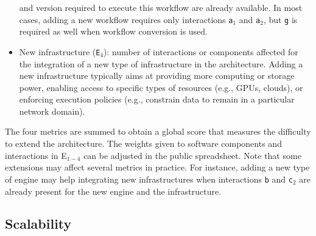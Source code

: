 \documentclass[preprint,3p,twocolumn]{elsarticle}
\newcommand{\correction}[1]{\color{blue}#1\color{black}\xspace}
\begin{document}
\begin{itemize}[leftmargin=0cm,itemindent=0.35cm,itemsep=0cm]
  and version required to execute this workflow are already
  available. In most cases, adding a new workflow requires only
  interactions \texttt{a$_1$} and \texttt{a$_2$}, but \texttt{g}
  is required as well when workflow conversion is used. 
\item New infrastructure (\texttt{E$_4$}): number of interactions or
  components affected for the integration of a new type of infrastructure in
  the architecture. Adding a new infrastructure typically aims at providing more
  computing or storage power, enabling access to specific types of resources
  (e.g., GPUs, clouds), or  enforcing execution policies (e.g.,
  constrain data to remain in a particular network domain).
\end{itemize}
The four metrics are summed to obtain a global score that measures the
difficulty to extend the architecture. \correction{The weights given to software components and interactions in E$_{1-4}$ can be adjusted in the public spreadsheet.} 
Note that some extensions may
affect several metrics in practice. For instance, adding a new type
of engine may help integrating new infrastructures when interactions
\texttt{b} and \texttt{c$_2$} are already present for the new engine
and the infrastructure.

\subsection{\correction{Scalability}}
\end{document}
